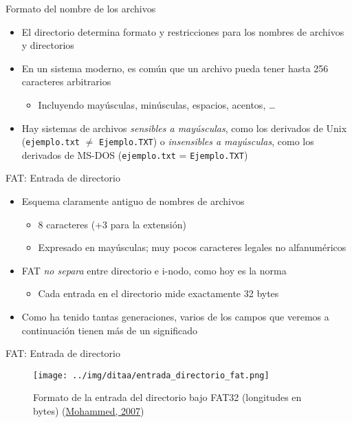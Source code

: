\documentclass[presentation]{beamer}
\begin{document}
\begin{frame}[label={sec:orge02b387},fragile]{Formato del nombre de los archivos}
 \begin{itemize}
\item El directorio determina formato y restricciones para los nombres de
archivos y directorios
\item En un sistema moderno, es común que un archivo pueda tener hasta
256 caracteres arbitrarios
\begin{itemize}
\item Incluyendo mayúsculas, minúsculas, espacios, acentos, \ldots{}
\end{itemize}
\item Hay sistemas de archivos \emph{sensibles a mayúsculas}, como los
derivados de Unix (\texttt{ejemplo.txt} \(\ne\) \texttt{Ejemplo.TXT}) o \emph{insensibles
a mayúsculas}, como los derivados de MS-DOS (\texttt{ejemplo.txt} =
\texttt{Ejemplo.TXT})
\end{itemize}
\end{frame}

\begin{frame}[label={sec:org39ff5c5}]{FAT: Entrada de directorio}
\begin{itemize}
\item Esquema claramente antiguo de nombres de archivos
\begin{itemize}
\item 8 caracteres (+3 para la extensión)
\item Expresado en mayúsculas; muy pocos caracteres legales no alfanuméricos
\end{itemize}
\item FAT \emph{no separa} entre directorio e i-nodo, como hoy es la norma
\begin{itemize}
\item Cada entrada en el directorio mide exactamente 32 bytes
\end{itemize}
\item Como ha tenido tantas generaciones, varios de los campos que veremos
a continuación tienen más de un significado
\end{itemize}
\end{frame}

\begin{frame}[label={sec:orgfc86845}]{FAT: Entrada de directorio}
\begin{figure}[htbp]
\centering
\texttt{[image: ../img/ditaa/entrada\_directorio\_fat.png]}
\caption{Formato de la entrada del directorio bajo FAT32 (longitudes en bytes) (\href{http://www.codeguru.com/cpp/cpp/cpp\\\_mfc/files/article.php/c13831/FAT-Root-Directory-Structure-on-Floppy-Disk-and-File-Information.htm}{Mohammed, 2007})}
\end{figure}
\end{frame}
\end{document}
